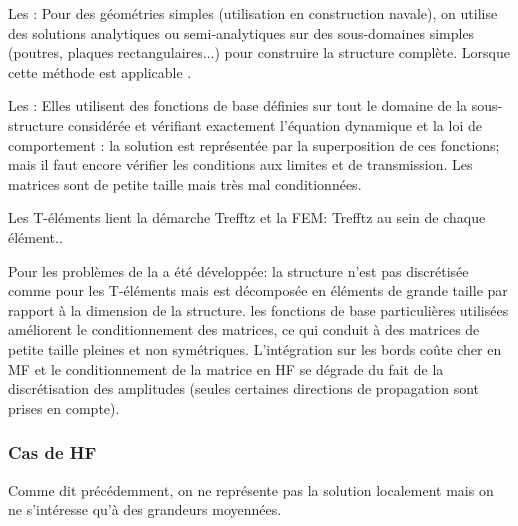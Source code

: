 \bigskip
Les : 
Pour des géométries simples (utilisation en construction navale), on utilise des solutions
analytiques ou semi-analytiques sur des sous-domaines simples (poutres, plaques rectangulaires...)
pour construire la structure complète.
Lorsque cette méthode est applicable .

\bigskip
Les : 
Elles utilisent des fonctions de base définies sur tout le domaine de la sous-structure considérée
et vérifiant exactement l'équation dynamique et la loi de comportement : la solution est représentée 
par la superposition de ces fonctions; mais il faut encore vérifier les conditions aux limites et de
transmission.
Les matrices sont de petite taille mais très mal conditionnées.

Les T-éléments lient la démarche Trefftz et la FEM: 
Trefftz au sein de chaque élément..

Pour les problèmes de  la  
a été développée:
la structure n'est pas discrétisée comme pour les T-éléments mais est décomposée en
éléments de grande taille par rapport à la dimension de la structure. les fonctions de base
particulières utilisées améliorent le conditionnement des matrices, ce qui conduit à des
matrices de petite taille pleines et non symétriques. L'intégration sur les bords coûte cher
en MF et le conditionnement de la matrice en HF se dégrade du fait de la discrétisation des amplitudes 
(seules certaines directions de propagation sont prises en compte).

\medskip
\subsubsection{Cas de HF}
Comme dit précédemment, on ne représente pas la solution localement mais on ne
s'intéresse qu'à des grandeurs moyennées.

